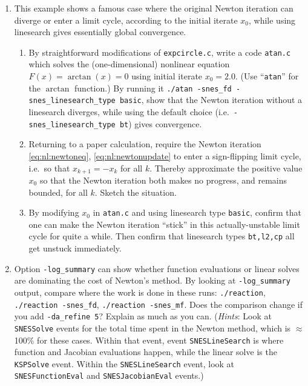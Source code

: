\begin{enumerate}
\item  \label{exer:nl:newtonatan}
This example shows a famous case where the original Newton iteration can diverge or enter a limit cycle, according to the initial iterate $x_0$, while using linesearch gives essentially global convergence.
    \begin{enumerate}
    \item By straightforward modifications of \texttt{expcircle.c}, write a code \texttt{atan.c} which solves the (one-dimensional) nonlinear equation $F(x)=\arctan(x)=0$ using initial iterate $x_0=2.0$.  (Use ``\texttt{atan}'' for the $\arctan$ function.)  By running it \texttt{./atan -snes\_fd -snes\_linesearch\_type basic}, show that the Newton iteration without a linesearch diverges, while using the default choice (i.e.~\texttt{-snes\_linesearch\_type bt}) gives convergence.
    \item Returning to a paper calculation, require the Newton iteration \eqref{eq:nl:newtoneq}, \eqref{eq:nl:newtonupdate} to enter a sign-flipping limit cycle, i.e.~so that $x_{k+1} = - x_k$ for all $k$.  Thereby approximate the positive value $x_0$ so that the Newton iteration both makes no progress, and remains bounded, for all $k$.  Sketch the situation.
    \item By modifying $x_0$ in \texttt{atan.c} and using linesearch type \texttt{basic}, confirm that one can make the Newton iteration ``stick'' in this actually-unstable limit cycle for quite a while.  Then confirm that linesearch types \texttt{bt,l2,cp} all get unstuck immediately.
    \end{enumerate}

\item Option \texttt{-log\_summary} can show whether function evaluations or linear solves are dominating the cost of Newton's method.  By looking at \texttt{-log\_summary} output, compare where the work is done in these runs: \texttt{./reaction}, \texttt{./reaction -snes\_fd}, \texttt{./reaction -snes\_mf}.  Does the comparison change if you add \texttt{-da\_refine 5}?  Explain as much as you can.  (\emph{Hints}: Look at \texttt{SNESSolve} events for the total time spent in the Newton method, which is $\approx$100\% for these cases.  Within that event, event \texttt{SNESLineSearch} is where function and Jacobian evaluations happen, while the linear solve is the \texttt{KSPSolve} event.  Within the \texttt{SNESLineSearch} event, look at \texttt{SNESFunctionEval} and \texttt{SNESJacobianEval} events.)


\end{enumerate}
